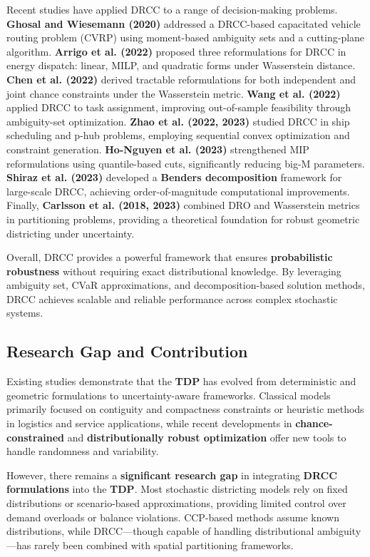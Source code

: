 \documentclass[preprint,12pt,authoryear]{elsarticle}
\begin{document}
Recent studies have applied DRCC to a range of decision-making problems. \textbf{Ghosal and Wiesemann (2020)} addressed a DRCC-based capacitated vehicle routing problem (CVRP) using moment-based ambiguity sets and a cutting-plane algorithm. \textbf{Arrigo et al. (2022)} proposed three reformulations for DRCC in energy dispatch: linear, MILP, and quadratic forms under Wasserstein distance. \textbf{Chen et al. (2022)} derived tractable reformulations for both independent and joint chance constraints under the Wasserstein metric. \textbf{Wang et al. (2022)} applied DRCC to task assignment, improving out-of-sample feasibility through ambiguity-set optimization. \textbf{Zhao et al. (2022, 2023)} studied DRCC in ship scheduling and p-hub problems, employing sequential convex optimization and constraint generation. \textbf{Ho-Nguyen et al. (2023)} strengthened MIP reformulations using quantile-based cuts, significantly reducing big-M parameters. \textbf{Shiraz et al. (2023)} developed a \textbf{Benders decomposition} framework for large-scale DRCC, achieving order-of-magnitude computational improvements. Finally, \textbf{Carlsson et al. (2018, 2023)} combined DRO and Wasserstein metrics in partitioning problems, providing a theoretical foundation for robust geometric districting under uncertainty.

Overall, DRCC provides a powerful framework that ensures \textbf{probabilistic robustness} without requiring exact distributional knowledge. By leveraging ambiguity set, CVaR approximations, and decomposition-based solution methods, DRCC achieves scalable and reliable performance across complex stochastic systems.

\subsection{Research Gap and Contribution}

Existing studies demonstrate that the \textbf{TDP} has evolved from deterministic and geometric formulations to uncertainty-aware frameworks. Classical models primarily focused on contiguity and compactness constraints or heuristic methods in logistics and service applications, while recent developments in \textbf{chance-constrained} and \textbf{distributionally robust optimization} offer new tools to handle randomness and variability.

However, there remains a \textbf{significant research gap} in integrating \textbf{DRCC formulations} into the \textbf{TDP}. Most stochastic districting models rely on fixed distributions or scenario-based approximations, providing limited control over demand overloads or balance violations. CCP-based methods assume known distributions, while DRCC—though capable of handling distributional ambiguity—has rarely been combined with spatial partitioning frameworks.
\end{document}
